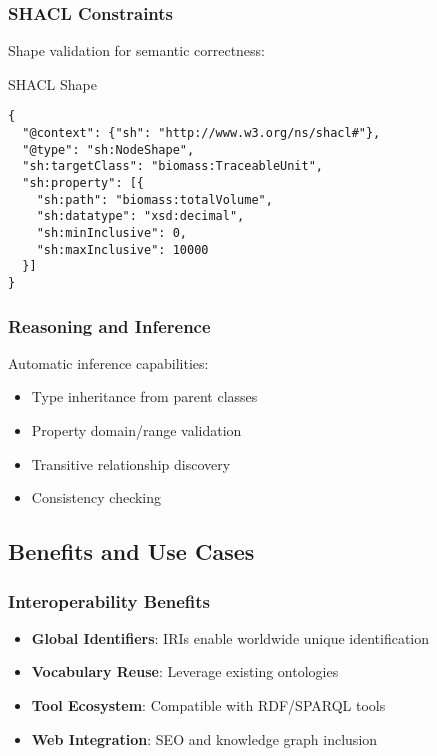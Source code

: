 \subsubsection{SHACL Constraints}

Shape validation for semantic correctness:

\begin{jsonexample}{SHACL Shape}
\begin{verbatim}
{
  "@context": {"sh": "http://www.w3.org/ns/shacl#"},
  "@type": "sh:NodeShape",
  "sh:targetClass": "biomass:TraceableUnit",
  "sh:property": [{
    "sh:path": "biomass:totalVolume",
    "sh:datatype": "xsd:decimal",
    "sh:minInclusive": 0,
    "sh:maxInclusive": 10000
  }]
}
\end{verbatim}
\end{jsonexample}

\subsubsection{Reasoning and Inference}

Automatic inference capabilities:

\begin{itemize}
    \item Type inheritance from parent classes
    \item Property domain/range validation
    \item Transitive relationship discovery
    \item Consistency checking
\end{itemize}

\subsection{Benefits and Use Cases}
\label{sec:jsonld-benefits}

\subsubsection{Interoperability Benefits}

\begin{itemize}
    \item \textbf{Global Identifiers}: IRIs enable worldwide unique identification
    \item \textbf{Vocabulary Reuse}: Leverage existing ontologies
    \item \textbf{Tool Ecosystem}: Compatible with RDF/SPARQL tools
    \item \textbf{Web Integration}: SEO and knowledge graph inclusion
\end{itemize}

